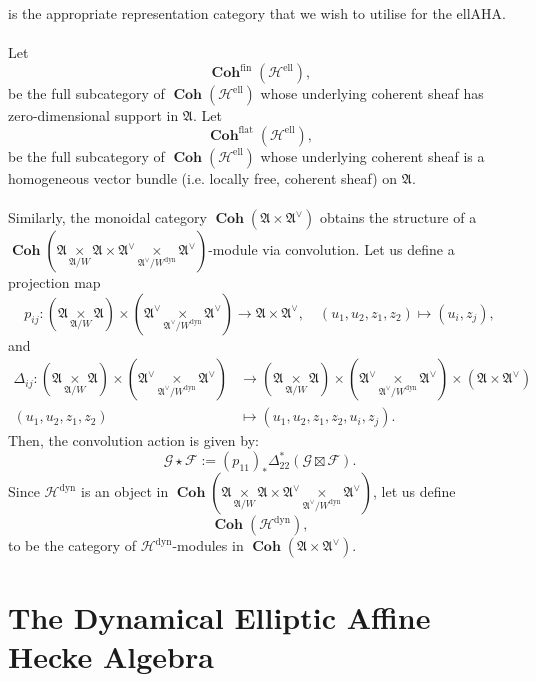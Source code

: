 \documentclass[a4paper]{report}
\theoremstyle{theorem}
\theoremstyle{definition}
\theoremstyle{remark}
\theoremstyle{proposition}
\theoremstyle{conjecture}
\theoremstyle{lemma}
\theoremstyle{corollary}
\theoremstyle{exercise}
\theoremstyle{example}
\newcommand{\mcal}{\mathcal}
\newcommand{\on}{\operatorname}
\newcommand{\coh}{\on{\mathbf{Coh}}}
\newcommand{\dyn}{{\on{dyn}}}
\begin{document}
  is the appropriate representation category that we wish to utilise for the 
  ellAHA.\\\\
  Let $$\coh^{\on{fin}}(\mcal{H}^{\on{ell}}),$$
  be the full subcategory of $\coh(\mcal{H}^{\on{ell}})$ whose underlying
  coherent sheaf has zero-dimensional support in $\mathfrak{A}$. Let 
  $$\coh^{\on{flat}}(\mcal{H}^{\on{ell}}),$$
  be the full subcategory of $\coh(\mcal{H}^{\on{ell}})$ whose underlying coherent
  sheaf is a homogeneous vector bundle (i.e. locally free, coherent sheaf)
  on $\mathfrak{A}$.\\\\
  Similarly, the monoidal category $\coh(\mathfrak{A} \times \mathfrak{A}^\vee)$
  obtains the structure of a $\coh(\mathfrak{A} \underset{\mathfrak{A}/W}{\times} \mathfrak{A} \times \mathfrak{A}^\vee \underset{\mathfrak{A}^\vee/W^\dyn}{\times} \mathfrak{A}^\vee)$-module 
  via convolution. 
  Let us define a projection map 
  $$p_{ij} : (\mathfrak{A} \underset{\mathfrak{A}/W}{\times} \mathfrak{A}) \times (\mathfrak{A}^\vee \underset{\mathfrak{A}^\vee/W^\dyn}{\times} \mathfrak{A}^\vee) \longrightarrow \mathfrak{A} \times \mathfrak{A}^\vee, \quad (u_1,u_2,z_1,z_2) \longmapsto (u_i,z_j),$$
  and 
  \begin{align*}
      \Delta_{ij} : (\mathfrak{A} \underset{\mathfrak{A}/W}{\times} \mathfrak{A}) \times (\mathfrak{A}^\vee \underset{\mathfrak{A}^\vee/W^\dyn}{\times} \mathfrak{A}^\vee) &\longrightarrow (\mathfrak{A} \underset{\mathfrak{A}/W}{\times} \mathfrak{A}) \times (\mathfrak{A}^\vee \underset{\mathfrak{A}^\vee/W^\dyn}{\times} \mathfrak{A}^\vee) \times (\mathfrak{A} \times \mathfrak{A}^\vee)\\
      (u_1,u_2,z_1,z_2) &\longmapsto (u_1,u_2,z_1,z_2,u_i,z_j).
  \end{align*}
  Then, the convolution action is given by:
  $$\mcal{G} \star \mcal{F} := (p_{11})_\ast \Delta_{22}^\ast (\mcal{G} \boxtimes \mcal{F}).$$
  Since $\mcal{H}^\dyn$ is an object in $\coh(\mathfrak{A} \underset{\mathfrak{A}/W}{\times} \mathfrak{A} \times \mathfrak{A}^\vee \underset{\mathfrak{A}^\vee/W^\dyn}{\times} \mathfrak{A}^\vee)$, let us define $$\coh(\mcal{H}^\dyn),$$
  to be the category of $\mcal{H}^\dyn$-modules in $\coh(\mathfrak{A} \times\mathfrak{A}^\vee)$. 
  
  \chapter{The Dynamical Elliptic Affine Hecke Algebra}\label{app_D}
  
\end{document}
